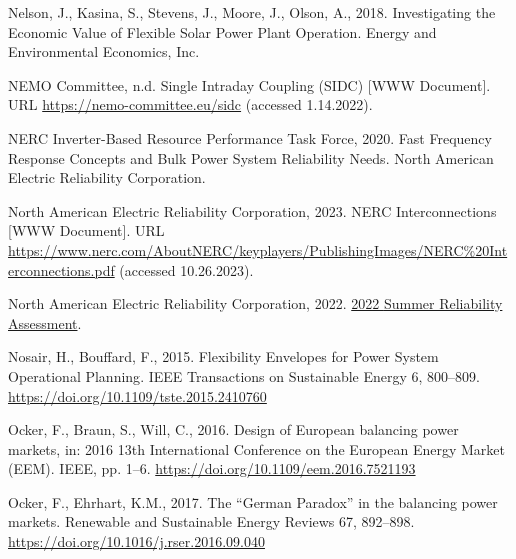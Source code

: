 \documentclass[12pt,a4paper,]{report}
\newlength{\cslhangindent}
\newenvironment{CSLReferences}[2] %
 {%
  \setlength{\parindent}{0pt}
  \ifodd #1 \everypar{\setlength{\hangindent}{\cslhangindent}}\ignorespaces\fi
  \ifnum #2 > 0
  \setlength{\parskip}{#2\baselineskip}
  \fi
 }%
 {}
\begin{document}
\begin{CSLReferences}{1}{0}
\leavevmode{}%
Nelson, J., Kasina, S., Stevens, J., Moore, J., Olson, A., 2018.
Investigating the {Economic Value} of {Flexible Solar Power Plant
Operation}. {Energy and Environmental Economics, Inc.}

\leavevmode{}%
NEMO Committee, n.d. Single Intraday Coupling (SIDC) {[}WWW Document{]}.
URL \url{https://nemo-committee.eu/sidc} (accessed 1.14.2022).

\leavevmode{}%
NERC Inverter-Based Resource Performance Task Force, 2020. Fast
{Frequency Response Concepts} and {Bulk Power System Reliability Needs}.
{North American Electric Reliability Corporation}.

\leavevmode{}%
North American Electric Reliability Corporation, 2023. {NERC
Interconnections} {[}WWW Document{]}. URL
\url{https://www.nerc.com/AboutNERC/keyplayers/PublishingImages/NERC\%20Interconnections.pdf}
(accessed 10.26.2023).

\leavevmode{}%
North American Electric Reliability Corporation, 2022.
\href{https://www.nerc.com/pa/RAPA/ra/Reliability\%20Assessments\%20DL/NERC_SRA_2022.pdf}{2022
{Summer Reliability Assessment}}.

\leavevmode{}%
Nosair, H., Bouffard, F., 2015. Flexibility {Envelopes} for {Power
System Operational Planning}. IEEE Transactions on Sustainable Energy 6,
800--809. \url{https://doi.org/10.1109/tste.2015.2410760}

\leavevmode{}%
Ocker, F., Braun, S., Will, C., 2016. Design of {European} balancing
power markets, in: 2016 13th {International Conference} on the {European
Energy Market} ({EEM}). {IEEE}, pp. 1--6.
\url{https://doi.org/10.1109/eem.2016.7521193}

\leavevmode{}%
Ocker, F., Ehrhart, K.M., 2017. The {``{German Paradox}''} in the
balancing power markets. Renewable and Sustainable Energy Reviews 67,
892--898. \url{https://doi.org/10.1016/j.rser.2016.09.040}


\end{CSLReferences}
\end{document}
